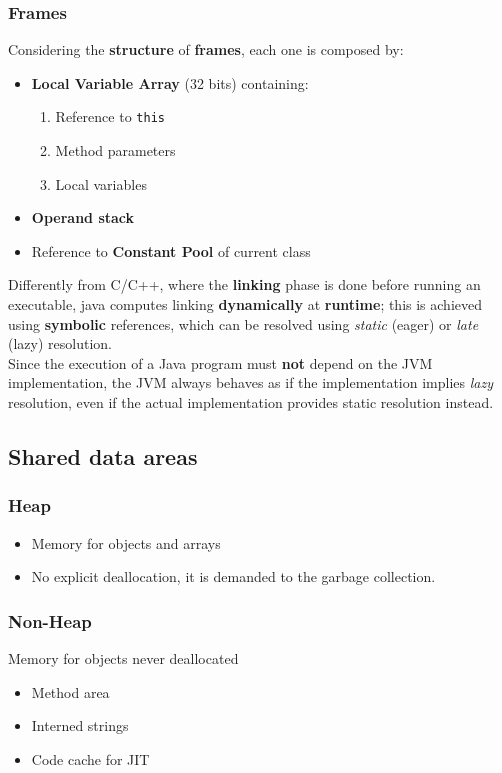 \subsubsection{Frames}
Considering the \textbf{structure} of \textbf{frames}, each one is composed by:
\begin{itemize}
    \item \textbf{Local Variable Array} (32 bits) containing:
    \begin{enumerate}
        \item Reference to \lstinline{this}
        \item Method parameters
        \item Local variables
    \end{enumerate}
    \item \textbf{Operand stack}
    \item Reference to \textbf{Constant Pool} of current class
\end{itemize}

Differently from C/C++, where the \textbf{linking} phase is done before running an executable,
java computes linking \textbf{dynamically} at \textbf{runtime};
this is achieved using \textbf{symbolic} references, which can be resolved using \textit{static} (eager) or \textit{late} (lazy) resolution.\\
Since the execution of a Java program must \textbf{not} depend on the JVM implementation, the JVM always behaves as if the implementation implies \textit{lazy} resolution, 
even if the actual implementation provides static resolution instead.

\subsection{Shared data areas}
\subsubsection{Heap}
\begin{itemize}
    \item Memory for objects and arrays
    \item No explicit deallocation, it is demanded to the garbage collection.
\end{itemize}

\subsubsection{Non-Heap}
Memory for objects never deallocated
\begin{itemize}
    \item Method area
    \item Interned strings
    \item Code cache for JIT
\end{itemize}

